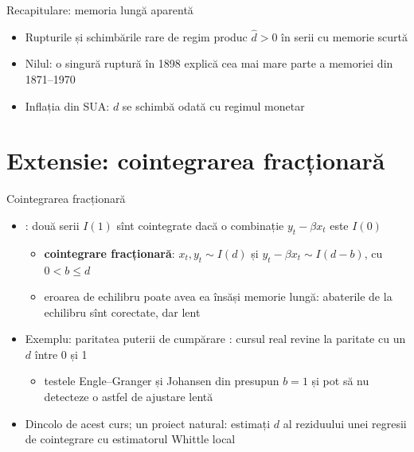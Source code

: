 \begin{frame}{Recapitulare: memoria lungă aparentă}
\itemsize{\small}
\begin{itemize}
    \item Rupturile și schimbările rare de regim produc $\hat d > 0$ în serii cu memorie scurtă
    \item Nilul: o singură ruptură în 1898 explică cea mai mare parte a memoriei din 1871--1970
    \item Inflația din SUA: $d$ se schimbă odată cu regimul monetar
\end{itemize}
\end{frame}


\section{Extensie: cointegrarea fracționară}

\begin{frame}{Cointegrarea fracționară}
\itemsize{\small}
\begin{itemize}
    \item {}: două serii $I(1)$ sînt cointegrate dacă o combinație $y_t - \beta x_t$ este $I(0)$
    \begin{itemize}
        \item \textbf{cointegrare fracționară}: $x_t, y_t \sim I(d)$ și $y_t - \beta x_t \sim I(d - b)$, cu $0 < b \le d$
        \item eroarea de echilibru poate avea ea însăși memorie lungă: abaterile de la echilibru sînt corectate, dar lent
    \end{itemize}
    \item Exemplu: paritatea puterii de cumpărare : cursul real revine la paritate cu un $d$ între 0 și 1
    \begin{itemize}
        \item testele Engle--Granger și Johansen din  presupun $b = 1$ și pot să nu detecteze o astfel de ajustare lentă
    \end{itemize}
    \item Dincolo de acest curs; un proiect natural: estimați $d$ al reziduului unei regresii de cointegrare cu estimatorul Whittle local
\end{itemize}
\end{frame}


